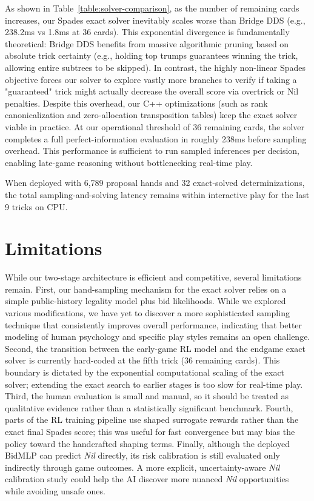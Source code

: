 \documentclass{article}
\begin{document}
As shown in Table~\ref{table:solver-comparison}, as the number of remaining cards increases, our Spades exact solver inevitably scales worse than Bridge DDS (e.g., 238.2ms vs 1.8ms at 36 cards). This exponential divergence is fundamentally theoretical: Bridge DDS benefits from massive algorithmic pruning based on absolute trick certainty (e.g., holding top trumps guarantees winning the trick, allowing entire subtrees to be skipped). In contrast, the highly non-linear Spades objective forces our solver to explore vastly more branches to verify if taking a "guaranteed" trick might actually decrease the overall score via overtrick or Nil penalties. Despite this overhead, our C++ optimizations (such as rank canonicalization and zero-allocation transposition tables) keep the exact solver viable in practice. At our operational threshold of 36 remaining cards, the solver completes a full perfect-information evaluation in roughly 238ms before sampling overhead. This performance is sufficient to run sampled inferences per decision, enabling late-game reasoning without bottlenecking real-time play.

When deployed with 6,789 proposal hands and 32 exact-solved determinizations, the total sampling-and-solving latency remains within interactive play for the last 9 tricks on CPU.

\section{Limitations}

While our two-stage architecture is efficient and competitive, several limitations remain. First, our hand-sampling mechanism for the exact solver relies on a simple public-history legality model plus bid likelihoods. While we explored various modifications, we have yet to discover a more sophisticated sampling technique that consistently improves overall performance, indicating that better modeling of human psychology and specific play styles remains an open challenge. Second, the transition between the early-game RL model and the endgame exact solver is currently hard-coded at the fifth trick (36 remaining cards). This boundary is dictated by the exponential computational scaling of the exact solver; extending the exact search to earlier stages is too slow for real-time play. Third, the human evaluation is small and manual, so it should be treated as qualitative evidence rather than a statistically significant benchmark. Fourth, parts of the RL training pipeline use shaped surrogate rewards rather than the exact final Spades score; this was useful for fast convergence but may bias the policy toward the handcrafted shaping terms. Finally, although the deployed BidMLP can predict \textit{Nil} directly, its risk calibration is still evaluated only indirectly through game outcomes. A more explicit, uncertainty-aware \textit{Nil} calibration study could help the AI discover more nuanced \textit{Nil} opportunities while avoiding unsafe ones.
\end{document}
